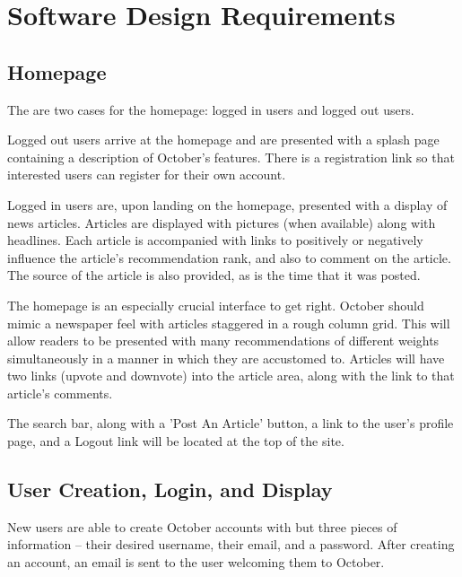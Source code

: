 \documentclass[11pt,letterpaper,titlepage]{article}
\begin{document}
\section{Software Design Requirements}

\subsection{Homepage}
\label{sec:homepagerequirements}
The are two cases for the homepage: logged in users and logged out users.

Logged out users arrive at the homepage and are presented with a splash page containing a description of October's features.
There is a registration link so that interested users can register for their own account.

Logged in users are, upon landing on the homepage, presented with a display of news articles.
Articles are displayed with pictures (when available) along with headlines.
Each article is accompanied with links to positively or negatively influence the article's recommendation rank, and also to comment on the article.
The source of the article is also provided, as is the time that it was posted.

The homepage is an especially crucial interface to get right.
October should mimic a newspaper feel with articles staggered in a rough column grid.
This will allow readers to be presented with many recommendations of different weights simultaneously in a manner in which they are accustomed to.
Articles will have two links (upvote and downvote) into the article area, along with the link to that article's comments.

The search bar, along with a 'Post An Article' button, a link to the user's profile page, and a Logout link will be located at the top of the site.

\subsection{User Creation, Login, and Display}
New users are able to create October accounts with but three pieces of information --  their desired username, their email, and a password.
After creating an account, an email is sent to the user welcoming them to October.
\end{document}
